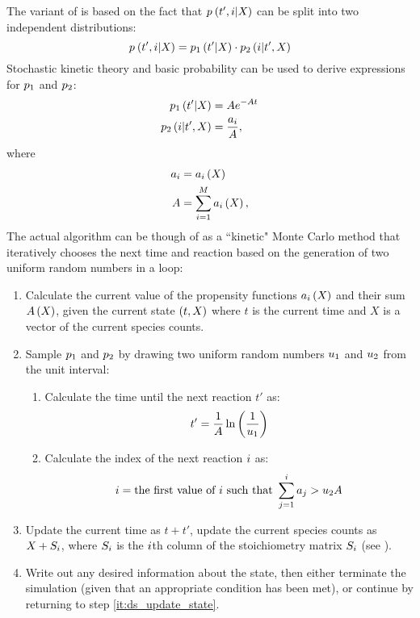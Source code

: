 The  variant of  is based on the fact that $p_{} \left( t', i | X_{} \right)$ can be split into two independent distributions:
\begin{equation*}
    p_{} \left( t', i | X_{} \right) = p_{1} \left( t' | X_{} \right) \cdot p_{2} \left( i | t', X_{} \right)
\end{equation*}
Stochastic kinetic theory and basic probability can be used to derive expressions\supercite{Gillespie:1976bj} for $p_{1}$ and $p_{2}$:
\begin{align}\label{eq:ds_probs}
    \begin{split}
        p_{1} \left( t' | X_{} \right) &= A e^{-A t} \\
        p_{2} \left( i | t', X_{} \right) &= \frac{a_{i}}{A},
    \end{split}
\end{align}
where
\begin{align*}
    \begin{split}
        a_{i} &= a_{i} \left( X_{} \right) \\
        A &= \sum_{i=1}^{M}a_{i} \left( X_{} \right),
    \end{split}
\end{align*}
The actual  algorithm can be though of as a ``kinetic" Monte Carlo method\supercite{Gillespie:2007bx} that iteratively chooses the next time and reaction based on the generation of two uniform random numbers in a loop:
\begin{enumerate}
    \item\label{it:ds_update_state} Calculate the current value of the propensity functions $a_{i} \left( X_{} \right)$ and their sum $A \left( X_{} \right)$, given the current state $\left( t, X_{} \right)$ where $t$ is the current time and $X$ is a vector of the current species counts.
    \item Sample $p_{1}$ and $p_{2}$ by drawing two uniform random numbers $u_{1}$ and $u_{2}$ from the unit interval:
    \begin{enumerate}
        \item Calculate the time until the next reaction $t'$ as:
        \begin{equation*}
            t' = \frac{1}{A} \ln \left( \frac{1}{u_{1}} \right)
        \end{equation*}
        \item Calculate the index of the next reaction $i$ as:
        \begin{equation*}
            i = \textrm{the first value of $i$ such that } \sum_{j=1}^{i} a_{j} > u_{2} A
        \end{equation*} 
    \end{enumerate}
    \item Update the current time as $t + t'$, update the current species counts as $X_{} + S_{i}$, where $S_{i}$ is the $i$th column of the stoichiometry matrix $S_{i}$ (see ).
    \item Write out any desired information about the state, then either terminate the simulation (given that an appropriate condition has been met), or continue by returning to step \ref{it:ds_update_state}.
\end{enumerate}
